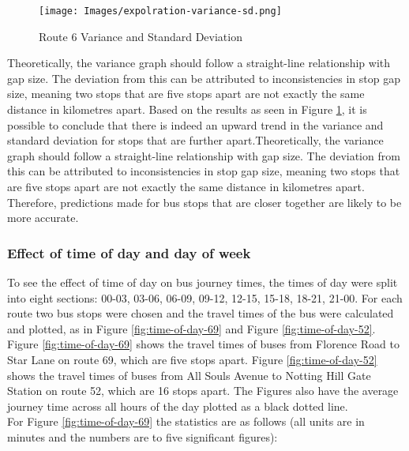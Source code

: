 \begin{figure}[H]
\begin{center}
    \texttt{[image: Images/expolration-variance-sd.png]}
    \caption{Route 6 Variance and Standard Deviation}
    \label{fig:variance-sd-6}
\end{center}
\end{figure}

Theoretically, the variance graph should follow a straight-line relationship with gap size. The deviation from this can be attributed to inconsistencies in stop gap size, meaning two stops that are five stops apart are not exactly the same distance in kilometres apart. Based on the results as seen in Figure \ref{fig:variance-sd-6}, it is possible to conclude that there is indeed an upward trend in the variance and standard deviation for stops that are further apart.Theoretically, the variance graph should follow a straight-line relationship with gap size. The deviation from this can be attributed to inconsistencies in stop gap size, meaning two stops that are five stops apart are not exactly the same distance in kilometres apart.  Therefore, predictions made for bus stops that are closer together are likely to be more accurate. 

\subsubsection{Effect of time of day and day of week}

To see the effect of time of day on bus journey times, the times of day were split into eight sections: 00-03, 03-06, 06-09, 09-12, 12-15, 15-18, 18-21, 21-00. For each route two bus stops were chosen and the travel times of the bus were calculated and plotted, as in Figure \ref{fig:time-of-day-69} and Figure \ref{fig:time-of-day-52}. Figure \ref{fig:time-of-day-69} shows the travel times of buses from Florence Road to Star Lane on route 69, which are five stops apart. Figure \ref{fig:time-of-day-52} shows the travel times of buses from All Souls Avenue to Notting Hill Gate Station on route 52, which are 16 stops apart. The Figures also have the average journey time across all hours of the day plotted as a black dotted line. \\

For Figure \ref{fig:time-of-day-69} the statistics are as follows (all units are in minutes and the numbers are to five significant figures):

